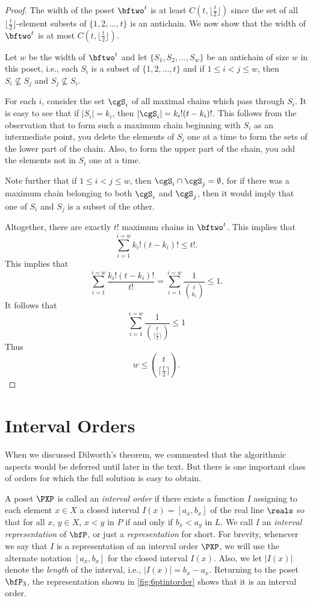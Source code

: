 \begin{proof}
The width of the poset $\bftwo^t$ is at least
$C(t,\lfloor\frac{t}{2}\rfloor)$ since the set of all
$\lfloor\frac{t}{2}\rfloor$-element subsets of $\{1,2,\dots,t\}$ is an
antichain.  We now show that the width of $\bftwo^t$ is at most
$C(t,\lfloor\frac{t}{2}\rfloor)$.

Let $w$ be the width of $\bftwo^t$ and let $\{S_1,S_2,\dots, S_w\}$ be
an antichain of size $w$ in this poset, i.e., each $S_i$ is a subset
of $\{1,2,\dots,t\}$ and if $1\le i<j\le w$, then $S_i\nsubseteq
S_j$ and $S_j\nsubseteq S_i$.

For each $i$, consider the set $\cgS_i$ of all maximal chains which
pass through $S_i$.  It is easy to see that if $|S_i|=k_i$, then
$|\cgS_i|=k_i!(t-k_i)!$.  This follows from the observation that to
form such a maximum chain beginning with $S_i$ as an intermediate
point, you delete the elements of $S_i$ one at a time to form the
sets of the lower part of the chain.  Also, to form the upper part
of the chain, you add the elements not in $S_i$ one at a time.

Note further that if $1\le i <j\le w$, then $\cgS_i\cap \cgS_j
=\emptyset$, for if there was a maximum chain belonging to both
$\cgS_i$ and $\cgS_j$, then it would imply that one of $S_i$ and
$S_j$ is a subset of the other.

Altogether, there are exactly $t!$ maximum chains in $\bftwo^t$.  This
implies that
\[\sum_{i=1}^{i=w} k_i!(t-k_i)!\le t!.\]
This implies that
\[\sum_{i=1}^{i=w}\frac{k_i!(t-k_i)!}{t!}=
\sum_{i=1}^{i=w}\frac{1}{\binom{t}{k_i}}\le 1. 
\]
It follows that
\[
\sum_{i=1}^{i=w}\frac{1}{\binom{t}{\lceil\frac{t}{2}\rceil}}\le 1
\]
Thus
\[
w\le \binom{t}{\lceil\frac{t}{2}\rceil}.
\]
\end{proof}

\section{Interval Orders}\label{s:posets:intervalorder}

When we discussed Dilworth's theorem, we commented that the
algorithmic aspects would be deferred until later in the text.  But
there is one important class of orders for which the full solution is
easy to obtain.

A poset $\PXP$ is called an \textit{interval order} if there exists a
function $I$ assigning to each element $x\in X$ a closed interval
$I(x)=[a_x,b_x]$ of the real line $\reals$ so that for all $x$, $y\in
X$, $x<y$ in $P$ if and only if $b_x<a_y$ in $L$.  We call $I$ an
\textit{interval representation} of $\bfP$, or just a
\textit{representation} for short.  For brevity, whenever we say that
$I$ is a representation of an interval order $\PXP$, we will use the
alternate notation $[a_x,b_x]$ for the closed interval $I(x)$.  Also,
we let $|I(x)|$ denote the \textit{length} of the interval, i.e.,
$|I(x)|=b_x-a_x$.  Returning to the poset $\bfP_3$, the representation
shown in \autoref{fig:6ptintorder} shows that it is an interval order.

